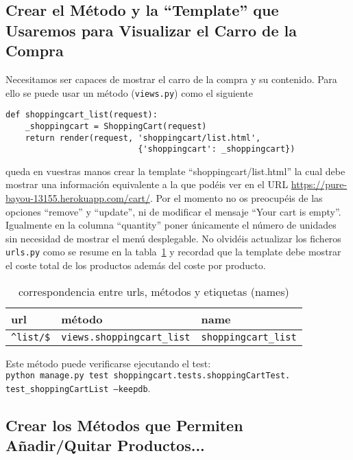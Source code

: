 \documentclass[12pt]{article} %
\newcommand{\herokuurl}[1]{\url{https://pure-bayou-13155.herokuapp.com/#1}}%
\newcommand{\ttt}[1]{\texttt{#1}}%
\newcommand{\views}{\texttt{views.py}}%
\newcommand{\urls}{\texttt{urls.py}}%
\begin{document}
\subsection{Crear el Método y la ``Template'' que Usaremos para Visualizar el Carro de la Compra}

Necesitamos ser capaces de mostrar el carro de la compra y su contenido. Para ello se puede usar un método (\views) como el siguiente

\begin{lstlisting}
def shoppingcart_list(request):
    _shoppingcart = ShoppingCart(request)
    return render(request, 'shoppingcart/list.html',
                           {'shoppingcart': _shoppingcart})
\end{lstlisting}
queda en vuestras manos crear la template ``shoppingcart/list.html'' la cual debe mostrar una información equivalente a la que podéis ver en el URL \herokuurl{cart/}. Por el momento no os preocupéis de las opciones ``remove'' y ``update'', ni de modificar el mensaje ``Your cart is empty''. Igualmente en la columna ``quantity'' poner únicamente el número de unidades sin necesidad de mostrar el menú desplegable. No olvidéis actualizar los ficheros \urls{} como se resume en la tabla~\ref{tab:urlsshopping} y recordad que la template debe mostrar el coste total de los productos además del coste por producto.

\begin{table}[H]
\centering
\begin{tabular}{lll}
    \textbf{url} & \textbf{método} & \textbf{name} \\ \hline
 \verb|^list/$|  & \verb|views.shoppingcart_list|  & \verb|shoppingcart_list|\\
\end{tabular}
\caption{correspondencia entre urls, métodos y etiquetas (names)}
\label{tab:urlsshopping}
\end{table}

Este método puede verificarse ejecutando el test:\\ \ttt{python manage.py test shoppingcart.tests.shoppingCartTest.\\test\_shoppingCartList --keepdb}. 

\subsection{Crear los Métodos que Permiten Añadir/Quitar Productos...}
\end{document}
